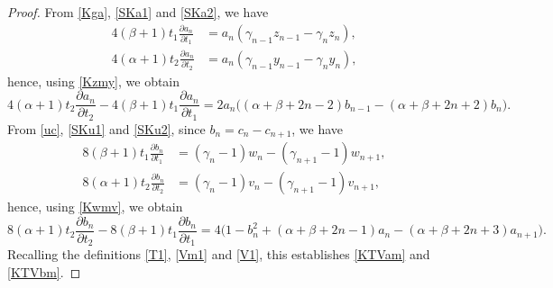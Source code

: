 \documentclass[10pt, reqno]{amsart}
\numberwithin{equation}{section}
\numberwithin{equation}{section}
\begin{document}
\begin{proof}
From \eqref{Kga}, \eqref{SKa1} and \eqref{SKa2}, we have
\begin{align}
4(\beta+1)t_1\frac{\partial a_n}{\partial t_1}&=a_n(\gamma_{n-1}z_{n-1}-\gamma_n z_n),\label{Kda1}\\
4(\alpha+1)t_2\frac{\partial a_n}{\partial t_2}&=a_n(\gamma_{n-1}y_{n-1}-\gamma_ny_n),\label{Kda2}
\end{align}
hence, using \eqref{Kzmy}, we obtain
\begin{equation*}
4(\alpha+1)t_2\frac{\partial a_n}{\partial t_2}-4(\beta+1)t_1\frac{\partial a_n}{\partial t_1}
=2a_n\big((\alpha+\beta+2n-2)b_{n-1}-(\alpha+\beta+2n+2)b_n\big).
\end{equation*}
From \eqref{uc}, \eqref{SKu1} and \eqref{SKu2}, since $b_n=c_n-c_{n+1}$, we have
\begin{align}
8(\beta+1)t_1\frac{\partial b_n}{\partial t_1}&=(\gamma_n-1)w_n-(\gamma_{n+1}-1)w_{n+1},\label{Kdb1}\\
8(\alpha+1)t_2\frac{\partial b_n}{\partial t_2}&=(\gamma_n-1)v_n-(\gamma_{n+1}-1)v_{n+1}\label{Kdb2},
\end{align}
hence, using \eqref{Kwmv}, we obtain
\begin{equation*}
8(\alpha+1)t_2\frac{\partial b_n}{\partial t_2}-8(\beta+1)t_1\frac{\partial b_n}{\partial t_1}
=4\big(1-b_n^2+(\alpha+\beta+2n-1)a_n-(\alpha+\beta+2n+3)a_{n+1}\big).
\end{equation*}
Recalling the definitions \eqref{T1}, \eqref{Vm1} and \eqref{V1}, this establishes \eqref{KTVam} and \eqref{KTVbm}.


\end{proof}
\end{document}
